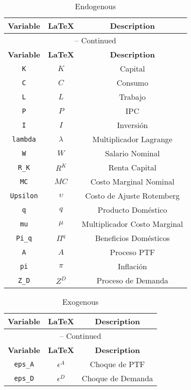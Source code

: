 \begin{center}
\begin{longtable}{ccc}
\caption{Endogenous}\\%
\hline%
\multicolumn{1}{c}{\textbf{Variable}} &
\multicolumn{1}{c}{\textbf{\LaTeX}} &
\multicolumn{1}{c}{\textbf{Description}}\\%
\hline\hline%
\endfirsthead
\multicolumn{3}{c}{{\tablename} \thetable{} -- Continued}\\%
\hline%
\multicolumn{1}{c}{\textbf{Variable}} &
\multicolumn{1}{c}{\textbf{\LaTeX}} &
\multicolumn{1}{c}{\textbf{Description}}\\%
\hline\hline%
\endhead
\texttt{K} & $K$ & Capital\\
\texttt{C} & $C$ & Consumo\\
\texttt{L} & $L$ & Trabajo\\
\texttt{P} & $P$ & IPC\\
\texttt{I} & $I$ & Inversión\\
\texttt{lambda} & $\lambda$ & Multiplicador Lagrange\\
\texttt{W} & $W$ & Salario Nominal\\
\texttt{R\_K} & $R^K$ & Renta Capital\\
\texttt{MC} & $MC$ & Costo Marginal Nominal\\
\texttt{Upsilon} & $\upsilon$ & Costo de Ajuste Rotemberg\\
\texttt{q} & $q$ & Producto Doméstico\\
\texttt{mu} & $\mu$ & Multiplicador Costo Marginal\\
\texttt{Pi\_q} & $\Pi^q$ & Beneficios Domésticos\\
\texttt{A} & $A$ & Proceso PTF\\
\texttt{pi} & $\pi$ & Inflación\\
\texttt{Z\_D} & $Z^D$ & Proceso de Demanda\\
\hline%
\end{longtable}
\end{center}
\begin{center}
\begin{longtable}{ccc}
\caption{Exogenous}\\%
\hline%
\multicolumn{1}{c}{\textbf{Variable}} &
\multicolumn{1}{c}{\textbf{\LaTeX}} &
\multicolumn{1}{c}{\textbf{Description}}\\%
\hline\hline%
\endfirsthead
\multicolumn{3}{c}{{\tablename} \thetable{} -- Continued}\\%
\hline%
\multicolumn{1}{c}{\textbf{Variable}} &
\multicolumn{1}{c}{\textbf{\LaTeX}} &
\multicolumn{1}{c}{\textbf{Description}}\\%
\hline\hline%
\endhead
\texttt{eps\_A} & $\epsilon^A$ & Choque de PTF\\
\texttt{eps\_D} & $\epsilon^D$ & Choque de Demanda\\
\hline%
\end{longtable}
\end{center}
